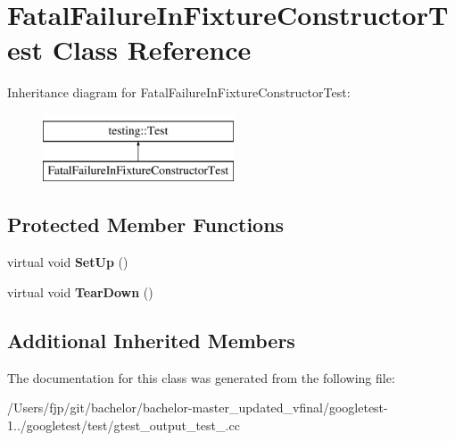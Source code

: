 \hypertarget{class_fatal_failure_in_fixture_constructor_test}{}\section{Fatal\+Failure\+In\+Fixture\+Constructor\+Test Class Reference}
\label{class_fatal_failure_in_fixture_constructor_test}
Inheritance diagram for Fatal\+Failure\+In\+Fixture\+Constructor\+Test\+:\begin{figure}[H]
\begin{center}
\leavevmode
\includegraphics[height=2.000000cm]{class_fatal_failure_in_fixture_constructor_test}
\end{center}
\end{figure}
\subsection*{Protected Member Functions}
\begin{DoxyCompactItemize}
\item 
\mbox{\label{class_fatal_failure_in_fixture_constructor_test_a006d3ac0e7a4ad3c469c3b41dc7c42c3}} 
virtual void {\bfseries Set\+Up} ()
\item 
\mbox{\label{class_fatal_failure_in_fixture_constructor_test_a2763026a557e1fce4e59bd16c4eced57}} 
virtual void {\bfseries Tear\+Down} ()
\end{DoxyCompactItemize}
\subsection*{Additional Inherited Members}


The documentation for this class was generated from the following file\+:\begin{DoxyCompactItemize}
\item 
/\+Users/fjp/git/bachelor/bachelor-\/master\+\_\+updated\+\_\+vfinal/googletest-\/1../googletest/test/gtest\+\_\+output\+\_\+test\+\_\+.\+cc\end{DoxyCompactItemize}
